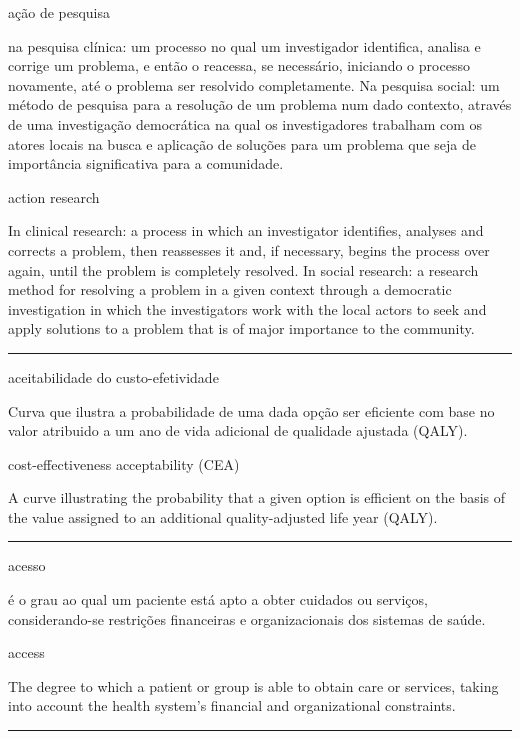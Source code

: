 \documentclass[
]{book}
\begin{document}
ação de pesquisa

na pesquisa clínica: um processo no qual um investigador identifica, analisa e corrige um problema, e então o reacessa, se necessário, iniciando o processo novamente, até o problema ser resolvido completamente. Na pesquisa social: um método de pesquisa para a resolução de um problema num dado contexto, através de uma investigação democrática na qual os investigadores trabalham com os atores locais na busca e aplicação de soluções para um problema que seja de importância significativa para a comunidade.

action research

In clinical research: a process in which an investigator identifies, analyses and corrects a problem, then reassesses it and, if necessary, begins the process over again, until the problem is completely resolved. In social research: a research method for resolving a problem in a given context through a democratic investigation in which the investigators work with the local actors to seek and apply solutions to a problem that is of major importance to the community.

\begin{center}\rule{0.5\linewidth}{0.5pt}\end{center}

aceitabilidade do custo-efetividade

Curva que ilustra a probabilidade de uma dada opção ser eficiente com base no valor atribuido a um ano de vida adicional de qualidade ajustada (QALY).

cost-effectiveness acceptability (CEA)

A curve illustrating the probability that a given option is efficient on the basis of the value assigned to an additional quality-adjusted life year (QALY).

\begin{center}\rule{0.5\linewidth}{0.5pt}\end{center}

acesso

é o grau ao qual um paciente está apto a obter cuidados ou serviços, considerando-se restrições financeiras e organizacionais dos sistemas de saúde.

access

The degree to which a patient or group is able to obtain care or services, taking into account the health system's financial and organizational constraints.

\begin{center}\rule{0.5\linewidth}{0.5pt}\end{center}
\end{document}

